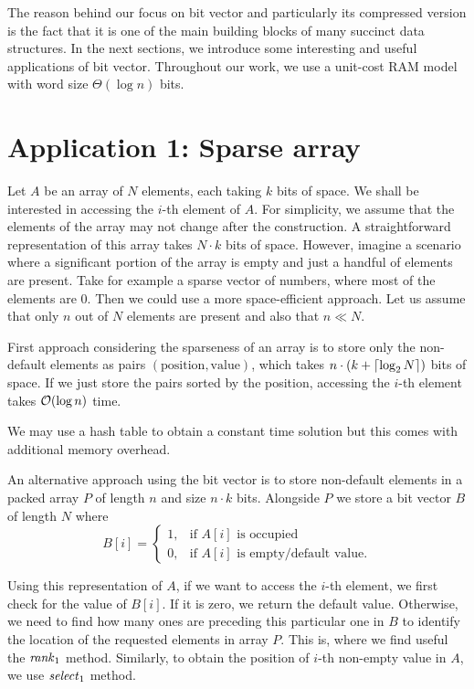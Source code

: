 The reason behind our focus on bit vector and particularly its compressed version
is the fact that it is one of the main building blocks of many succinct data structures.
In the next sections, we introduce some interesting and useful applications of bit vector.
Throughout our work, we use a unit-cost RAM model with word size $\Theta(\log n)$ bits.

\section{Application 1: Sparse array}

Let $A$ be an array of $N$ elements, each taking $k$ bits of space. We shall be
interested in accessing the $i$-th element of $A$. For simplicity, we assume that
the elements of the array may not change after the construction. A straightforward
representation of this array takes $N\cdot k$ bits of space. However, imagine a
scenario where a significant portion of the array is empty and just a handful of
elements are present. Take for example a sparse vector of numbers, where most of
the elements are 0. Then we could use a more space-efficient approach. Let us
assume that only $n$ out of $N$ elements are present and also that $n\ll N$.

First approach considering the sparseness of an array is to store only the non-default
elements as pairs $(\text{position}, \text{value})$, which takes $n\cdot (k+\left\lceil \log_2 N \right\rceil)$
bits of space. If we just store the pairs sorted by the position, accessing the $i$-th
element takes $\mathcal{O}(\log n)$ time.

We may use a hash table to obtain a constant time solution but this comes with additional
memory overhead.

An alternative approach using the bit vector is to store non-default elements in
a packed array $P$ of length $n$ and size $n\cdot k$ bits. Alongside $P$ we store
a bit vector $B$ of length $N$ where
\[
   B[i]=
\begin{cases}
   1,& \text{if $A[i]$ is occupied} \\
   0,& \text{if $A[i]$ is empty/default value.}
\end{cases}
\]

Using this representation of $A$, if we want to access the $i$-th element, we first check for
the value of $B[i]$. If it is zero, we return the default value. Otherwise, we need to find
how many ones are preceding this particular one in $B$ to identify the location of the requested
elements in array $P$. This is, where we find useful the $\mathit{rank}_1$ method. Similarly, to obtain
the position of $i$-th non-empty value in $A$, we use $\mathit{select}_1$ method.

